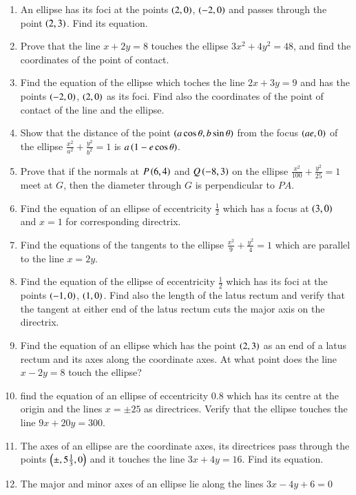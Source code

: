 \renewcommand{\theequation}{\theenumi}
\begin{enumerate}[label=\arabic*.,ref=\thesubsection.\theenumi]
\item An ellipse has its foci at the points $\left(2,0\right)$, $\left(-2,0\right)$
and passes through the point $\left(2,3\right)$.  Find its equation.
\item Prove that the line $x+2y=8$ touches the ellipse $3x^2+4y^2=48$,
and find the coordinates of the point of contact.
\item Find the equation of the ellipse which toches the line $2x+3y=9$
and has the points $\left(-2,0\right)$, $\left(2,0\right)$ as its foci.  Find also
the coordinates of the point of contact of the line and the ellipse.
\item Show that the distance of the point $\left(a\cos \theta,b\sin \theta\right)$
from the focus $\left(ae,0\right)$ of the ellipse $\frac{x^2}{a^2}+\frac{y^2}{b^2}=1$
is $a\left(1-e\cos\theta\right)$.  
\item Prove that if the normals at $P \left(6,4\right)$ and $Q \left(-8,3\right)$ on
the  ellipse $\frac{x^2}{100}+\frac{y^2}{25} = 1$ meet at $G$, then the 
diameter through $G$ is perpendicular to $PA$.  
\item Find the equation of an ellipse of eccentricity $\frac{1}{2}$ which has
a focus at $\left(3,0\right)$ and $x=1$ for corresponding directrix.
\item Find the equations of the tangents to the ellipse $\frac{x^2}{9}+\frac{y^2}{4}=1$
which are parallel to the line $x=2y$.  
\item Find the equation of the ellipse of eccentricity $\frac{1}{2}$ which has
its foci at the points $\left(-1,0\right)$, $\left(1,0\right)$.  Find also the length
of the latus rectum and verify that the tangent at either end of the latus rectum
cuts the major axis on the directrix.
\item Find the equation of an ellipse which has the point $\left(2,3\right)$ as an
end of a latus rectum and its axes along the coordinate axes.  At what point
does the line $x-2y=8$ touch the ellipse?
\item find the equation of an ellipse of eccentricity 0.8 which has its
centre at the origin and the lines $x= \pm 25$ as directrices.  Verify that
the ellipse touches the line $9x+20y=300$.
\item The axes of an ellipse are the coordinate axes, its directrices pass through
the points $\left(\pm,5\frac{1}{3},0\right)$ and it touches the line $3x+4y=16$.  
Find its equation.
\item The major and minor axes of an ellipse lie along the lines $3x-4y+6=0$

\end{enumerate}
